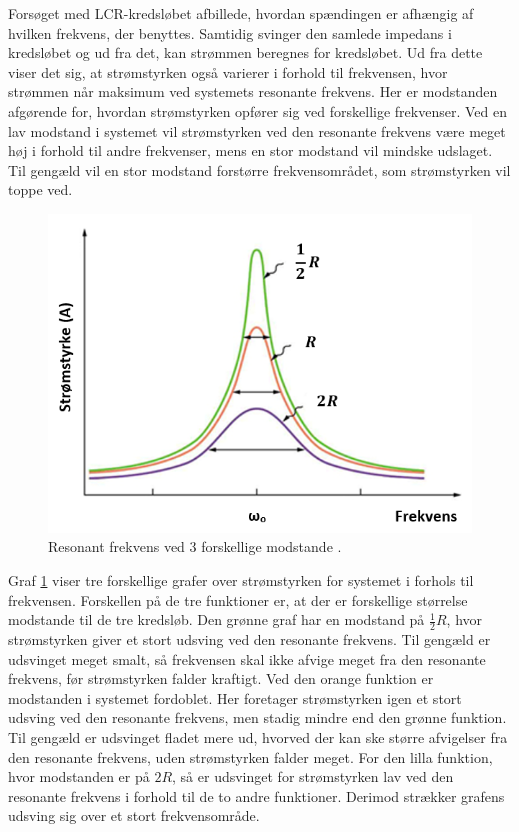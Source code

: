 Forsøget med LCR-kredsløbet afbillede, hvordan spændingen er afhængig af hvilken frekvens, der benyttes. Samtidig svinger den samlede impedans i kredsløbet og ud fra det, kan strømmen beregnes for kredsløbet. Ud fra dette viser det sig, at strømstyrken også varierer i forhold til frekvensen, hvor strømmen når maksimum ved systemets resonante frekvens. Her er modstanden afgørende for, hvordan strømstyrken opfører sig ved forskellige frekvenser. Ved en lav modstand i systemet vil strømstyrken ved den resonante frekvens være meget høj i forhold til andre frekvenser, mens en stor modstand vil mindske udslaget. Til gengæld vil en stor modstand forstørre frekvensområdet, som strømstyrken vil toppe ved.

\begin{figure}[H]
\centering
\includegraphics[scale=0.75]{Vildledning/Schematics/Resonanskurver}
\caption{Resonant frekvens ved 3 forskellige modstande \cite{Bresonant}.}
\label{figure:resonantfrekvens}
\end{figure}

Graf \ref{figure:resonantfrekvens} viser tre forskellige grafer over strømstyrken for systemet i forhols til frekvensen. Forskellen på de tre funktioner er, at der er forskellige størrelse modstande til de tre kredsløb. Den grønne graf har en modstand på $\frac{1}{2} R$, hvor strømstyrken giver et stort udsving ved den resonante frekvens. Til gengæld er udsvinget meget smalt, så frekvensen skal ikke afvige meget fra den resonante frekvens, før strømstyrken falder kraftigt. Ved den orange funktion er modstanden i systemet fordoblet. Her foretager strømstyrken igen et stort udsving ved den resonante frekvens, men stadig mindre end den grønne funktion. Til gengæld er udsvinget fladet mere ud, hvorved der kan ske større afvigelser fra den resonante frekvens, uden strømstyrken falder meget. For den lilla funktion, hvor modstanden er på $2 R$, så er udsvinget for strømstyrken lav ved den resonante frekvens i forhold til de to andre funktioner. Derimod strækker grafens udsving sig over et stort frekvensområde.


